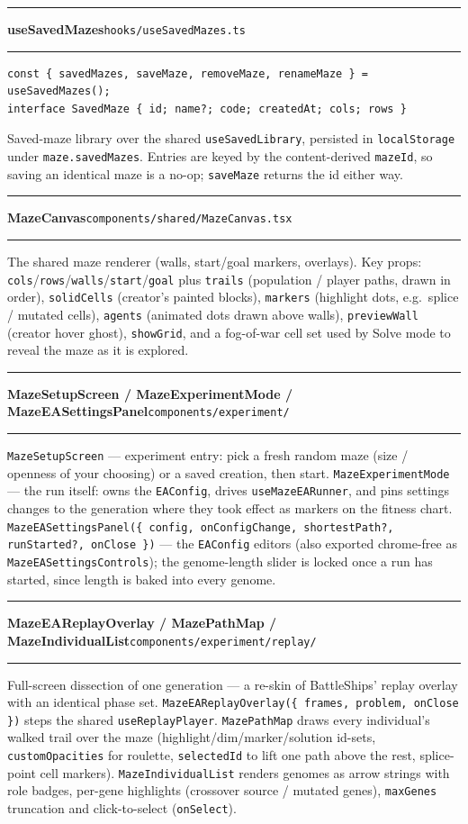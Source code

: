 \documentclass[11pt,a4paper]{report}
\newcommand{\srcfile}[1]{\texttt{\small #1}}   %
\newcommand{\ts}[1]{\texttt{#1}}               %
\newenvironment{apientry}[2]{%
  \par\medskip\noindent
  \begin{minipage}{\textwidth}
  \hrule\vspace{0.6ex}
  {\large\ttfamily\bfseries #1}\hfill{\footnotesize\srcfile{#2}}
  \vspace{0.4ex}\hrule\medskip
}{%
  \end{minipage}\par\medskip
}
\begin{document}
\begin{apientry}{useSavedMazes}{hooks/useSavedMazes.ts}
\begin{lstlisting}
const { savedMazes, saveMaze, removeMaze, renameMaze } = useSavedMazes();
interface SavedMaze { id; name?; code; createdAt; cols; rows }
\end{lstlisting}
Saved-maze library over the shared \ts{useSavedLibrary}, persisted in
\ts{localStorage} under \ts{maze.savedMazes}. Entries are keyed by the
content-derived \ts{mazeId}, so saving an identical maze is a no-op;
\ts{saveMaze} returns the id either way.
\end{apientry}

\begin{apientry}{MazeCanvas}{components/shared/MazeCanvas.tsx}
The shared maze renderer (walls, start/goal markers, overlays). Key
props: \ts{cols}/\ts{rows}/\ts{walls}/\ts{start}/\ts{goal} plus
\ts{trails} (population / player paths, drawn in order),
\ts{solidCells} (creator's painted blocks), \ts{markers} (highlight dots,
e.g.\ splice / mutated cells), \ts{agents} (animated dots drawn above
walls), \ts{previewWall} (creator hover ghost), \ts{showGrid}, and a
fog-of-war cell set used by Solve mode to reveal the maze as it is
explored.
\end{apientry}

\begin{apientry}{MazeSetupScreen / MazeExperimentMode /
MazeEASettingsPanel}{components/experiment/}
\ts{MazeSetupScreen} --- experiment entry: pick a fresh random maze (size
/ openness of your choosing) or a saved creation, then start.
\ts{MazeExperimentMode} --- the run itself: owns the \ts{EAConfig},
drives \ts{useMazeEARunner}, and pins settings changes to the generation
where they took effect as markers on the fitness chart.
\ts{MazeEASettingsPanel(\{ config, onConfigChange, shortestPath?,
runStarted?, onClose \})} --- the \ts{EAConfig} editors (also exported
chrome-free as \ts{MazeEASettingsControls}); the genome-length slider is
locked once a run has started, since length is baked into every genome.
\end{apientry}

\begin{apientry}{MazeEAReplayOverlay / MazePathMap / MazeIndividualList}
{components/experiment/replay/}
Full-screen dissection of one generation --- a re-skin of BattleShips'
replay overlay with an identical phase set.
\ts{MazeEAReplayOverlay(\{ frames, problem, onClose \})} steps the shared
\ts{useReplayPlayer}. \ts{MazePathMap} draws every individual's walked
trail over the maze (highlight/dim/marker/solution id-sets,
\ts{customOpacities} for roulette, \ts{selectedId} to lift one path above
the rest, splice-point cell markers). \ts{MazeIndividualList} renders
genomes as arrow strings with role badges, per-gene highlights
(crossover source / mutated genes), \ts{maxGenes} truncation and
click-to-select (\ts{onSelect}).
\end{apientry}
\end{document}
